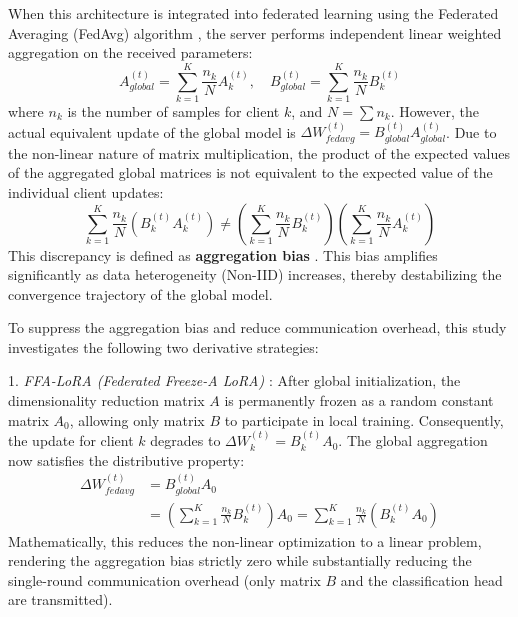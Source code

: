 When this architecture is integrated into federated learning using the Federated Averaging (FedAvg) algorithm \cite{mcmahan2017communication}, the server performs independent linear weighted aggregation on the received parameters:
\begin{equation}
A_{global}^{(t)} = \sum_{k=1}^{K} \frac{n_k}{N} A_k^{(t)}, \quad B_{global}^{(t)} = \sum_{k=1}^{K} \frac{n_k}{N} B_k^{(t)}
\end{equation}
where $n_k$ is the number of samples for client $k$, and $N = \sum n_k$. However, the actual equivalent update of the global model is $\Delta W_{fedavg}^{(t)} = B_{global}^{(t)} A_{global}^{(t)}$. Due to the non-linear nature of matrix multiplication, the product of the expected values of the aggregated global matrices is not equivalent to the expected value of the individual client updates:
\begin{equation}
\sum_{k=1}^{K} \frac{n_k}{N} (B_k^{(t)} A_k^{(t)}) \neq \left( \sum_{k=1}^{K} \frac{n_k}{N} B_k^{(t)} \right) \left( \sum_{k=1}^{K} \frac{n_k}{N} A_k^{(t)} \right)
\end{equation}
This discrepancy is defined as \textbf{aggregation bias} \cite{ffa_lora_paper}. This bias amplifies significantly as data heterogeneity (Non-IID) increases, thereby destabilizing the convergence trajectory of the global model.

To suppress the aggregation bias and reduce communication overhead, this study investigates the following two derivative strategies:

1. \textit{FFA-LoRA (Federated Freeze-A LoRA)} \cite{ffa_lora_paper}: After global initialization, the dimensionality reduction matrix $A$ is permanently frozen as a random constant matrix $A_0$, allowing only matrix $B$ to participate in local training. Consequently, the update for client $k$ degrades to $\Delta W_k^{(t)} = B_k^{(t)} A_0$. The global aggregation now satisfies the distributive property:
\begin{equation}
\begin{aligned}
\Delta W_{fedavg}^{(t)} &= B_{global}^{(t)} A_0 \\
&= \left( \sum_{k=1}^{K} \frac{n_k}{N} B_k^{(t)} \right) A_0 = \sum_{k=1}^{K} \frac{n_k}{N} (B_k^{(t)} A_0)
\end{aligned}
\end{equation}
Mathematically, this reduces the non-linear optimization to a linear problem, rendering the aggregation bias strictly zero while substantially reducing the single-round communication overhead (only matrix $B$ and the classification head are transmitted).

